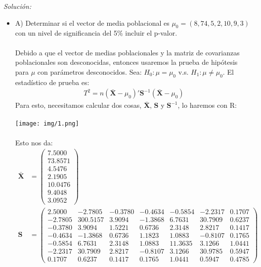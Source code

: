 \documentclass[12pt]{article}
\newenvironment{sol}
    {\emph{Solución:}
    }
    {
    }
\begin{document}
\begin{sol}
\begin{itemize}
\item A) Determinar si el vector de media poblacional es $\mu_0=(8,74,5,2,10,9,3)$ con un nivel
de significancia del 5\% incluir el p-valor.\\\\
Debido a que el vector de medias poblacionales y la matriz de covarianzas poblacionales son desconocidas, entonces usaremos la prueba de hipótesis para $\mu$ con parámetros desconocidos. Sea:
$H_0:\mu = \mu_0 $ v.s. $H_1:\mu \neq \mu_0$.
El estadístico de prueba es:
\begin{align*}
T^2=n(\bar{\mathbf{X}} - \mu_0)'\mathbf{S}^{-1}(\mathbf{\bar{X}}-\mu_0)
\end{align*}
Para esto, necesitamos calcular dos cosas, $\mathbf{\bar{X}}$, $\mathbf{S}$ y $\mathbf{S}^{-1}$, lo haremos con R:\\\\
\texttt{[image: img/1.png]}\\\\
Esto nos da:
\begin{align*}
\mathbf{\bar{X}} &= \begin{pmatrix}
  7.5000 \\
  73.8571 \\
  4.5476 \\
  2.1905 \\
  10.0476 \\
  9.4048 \\
  3.0952
\end{pmatrix}\\
\mathbf{S} &= \begin{pmatrix}
  2.5000 & -2.7805 & -0.3780 & -0.4634 & -0.5854 & -2.2317 &  0.1707 \\
 -2.7805 & 300.5157 &  3.9094 & -1.3868 &  6.7631 & 30.7909 &  0.6237 \\
 -0.3780 &   3.9094 &  1.5221 &  0.6736 &  2.3148 &  2.8217 &  0.1417 \\
 -0.4634 &  -1.3868 &  0.6736 &  1.1823 &  1.0883 & -0.8107 &  0.1765 \\
 -0.5854 &   6.7631 &  2.3148 &  1.0883 & 11.3635 &  3.1266 &  1.0441 \\
 -2.2317 &  30.7909 &  2.8217 & -0.8107 &  3.1266 & 30.9785 &  0.5947 \\
  0.1707 &   0.6237 &  0.1417 &  0.1765 &  1.0441 &  0.5947 &  0.4785
\end{pmatrix} \\

\end{align*}
\end{itemize}
\end{sol}
\end{document}
